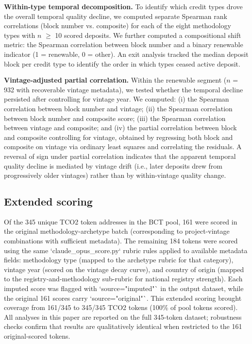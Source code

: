 \documentclass[11pt]{article}
\begin{document}
\textbf{Within-type temporal decomposition.} To identify which credit types drove the overall temporal quality decline, we computed separate Spearman rank correlations (block number vs. composite) for each of the eight methodology types with $n$ $\geq$ 10 scored deposits. We further computed a compositional shift metric: the Spearman correlation between block number and a binary renewable indicator (1 = renewable, 0 = other). An exit analysis tracked the median deposit block per credit type to identify the order in which types ceased active deposit.

\textbf{Vintage-adjusted partial correlation.} Within the renewable segment ($n$ = 932 with recoverable vintage metadata), we tested whether the temporal decline persisted after controlling for vintage year. We computed: (i) the Spearman correlation between block number and vintage; (ii) the Spearman correlation between block number and composite score; (iii) the Spearman correlation between vintage and composite; and (iv) the partial correlation between block and composite controlling for vintage, obtained by regressing both block and composite on vintage via ordinary least squares and correlating the residuals. A reversal of sign under partial correlation indicates that the apparent temporal quality decline is mediated by vintage drift (i.e., later deposits drew from progressively older vintages) rather than by within-vintage quality change.

\subsection*{Extended scoring}

Of the 345 unique TCO2 token addresses in the BCT pool, 161 were scored in the original methodology-archetype batch (corresponding to project-vintage combinations with sufficient metadata). The remaining 184 tokens were scored using the same `claude\_opus\_score.py` rubric rules applied to available metadata fields: methodology type (mapped to the archetype rubric for that category), vintage year (scored on the vintage decay curve), and country of origin (mapped to the registry-and-methodology sub-rubric for national registry strength). Each imputed score was flagged with `source="imputed"` in the output dataset, while the original 161 scores carry `source="original"`. This extended scoring brought coverage from 161/345 to 345/345 TCO2 tokens (100\% of pool tokens scored). All analyses in this paper are reported on the full 345-token dataset; robustness checks confirm that results are qualitatively identical when restricted to the 161 original-scored tokens.
\end{document}
